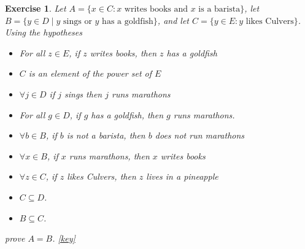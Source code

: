 \documentclass{book}
\newcounter{ekcounter}%
\theoremstyle{ekimcustom}
\newtheorem{exercise}[ekcounter]{Exercise}
\begin{document}
\begin{exercise}
Let $A = \{x \in C : x \text{ writes books and } x \text{ is a barista}\}$, 
let $B = \{y \in D \mid y \text{ sings or } y \text{ has a goldfish}\}$,
and let $C = \{y \in E : y \text{ likes Culvers}\}$. Using the hypotheses
\begin{itemize}
\item For all $z \in E$, if $z$ writes books, then $z$ has a goldfish
\item $C$ is an element of the power set of $E$
\item $\forall j \in D$ if $j$ sings then $j$ runs marathons
\item For all $g \in D$, if $g$ has a goldfish, then $g$ runs marathons.
\item $\forall b \in B$, if $b$ is not a barista, then $b$ does not run marathons
\item $\forall x \in B$, if $x$ runs marathons, then $x$ writes books
\item $\forall z \in C$, if $z$ likes Culvers, then $z$ lives in a pineapple
\item $C \subseteq D$.
\item $B \subseteq C$.
\end{itemize}
prove $A=B$.
\quad\href{https://www.sharelatex.com/project/59ea26b5c26a0a7656184834}{{\color{red}[key]}}
\end{exercise}
\end{document}
